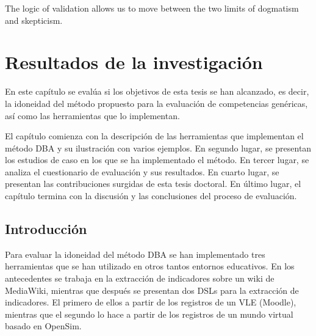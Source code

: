 

\begin{savequote}[50mm]
The logic of validation allows us to move between the two limits of dogmatism and skepticism. 
\end{savequote}


\chapter{Resultados de la investigación}
\label{cha:Validation of the methodology}

\ifpdf
    \graphicspath{{5_experiments_and_results/figures/PNG/}{5_experiments_and_results/figures/PDF/}{5_experiments_and_results/figures/}}
\else
    \graphicspath{{5_experiments_and_results/figures/EPS/}{5_experiments_and_results/figures/}}
\fi



En este capítulo se evalúa si los objetivos de esta tesis se han alcanzado, es decir, la idoneidad del método propuesto para la evaluación de competencias genéricas, así como las herramientas que lo implementan.

El capítulo comienza con la descripción de las herramientas que implementan el método DBA y su ilustración con varios ejemplos. En segundo lugar, se presentan los estudios de caso en los que se ha implementado el método. En tercer lugar, se analiza el cuestionario de evaluación y sus resultados. En cuarto lugar, se presentan las contribuciones surgidas de esta tesis doctoral. En último lugar, el capítulo termina con la discusión y las conclusiones del proceso de evaluación.

\section{Introducción}

	Para evaluar la idoneidad del método DBA se han implementado tres herramientas que se han utilizado en otros tantos entornos educativos. En los antecedentes se trabaja en la extracción de indicadores sobre un wiki de MediaWiki, mientras que después se presentan dos DSLs para la extracción de indicadores. El primero de ellos a partir de los registros de un VLE (Moodle), mientras que el segundo lo hace a partir de los registros de un mundo virtual basado en OpenSim.

